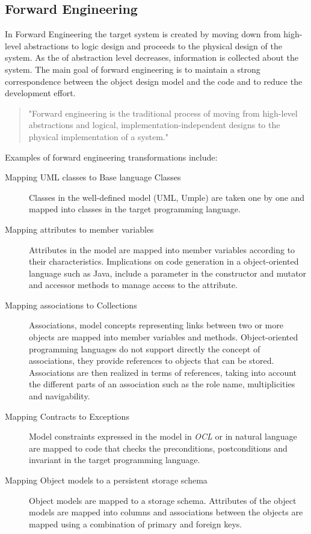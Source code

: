 \subsection{Forward Engineering}

In Forward Engineering the target system is created by moving down from high-level abstractions to logic design and proceeds to the physical design of the system. As the of abstraction level decreases, information is collected about the system. The main goal of forward engineering is to maintain a strong correspondence between the object design model and the code and to reduce the development effort. 

\begin{quote} 
"Forward engineering is the traditional process of moving from high-level abstractions and logical, implementation-independent designs to the physical implementation of a system." \cite{Chikofsky}
\end{quote} 

Examples of forward engineering transformations include:

\begin{description}

\item [Mapping UML classes to Base language Classes]
Classes in the well-defined model (UML, Umple) are taken one by one and mapped into classes in the target programming language. 
\item [Mapping attributes to member variables]
Attributes in the model are mapped into member variables according to their characteristics. Implications on code generation in a object-oriented language such as Java, include a parameter in the constructor and mutator and accessor methods to manage access to the attribute.
\item [Mapping associations to Collections]
Associations, model concepts representing links between two or more objects are mapped into member variables and methods. Object-oriented programming languages do not support directly the concept of associations, they provide references to objects that can be stored. Associations are then realized in terms of references, taking into account the different parts of an association such as the role name, multiplicities and navigability. 
\item [Mapping Contracts to Exceptions]
Model constraints expressed in the model in \textit{OCL} or in natural language are mapped to code that checks the preconditions, postconditions and invariant in the target programming language.
\item [Mapping Object models to a persistent storage schema]
Object models are mapped to a storage schema. Attributes of the object models are mapped into columns and associations between the objects are mapped using a combination of primary and foreign keys. 
\end{description}

